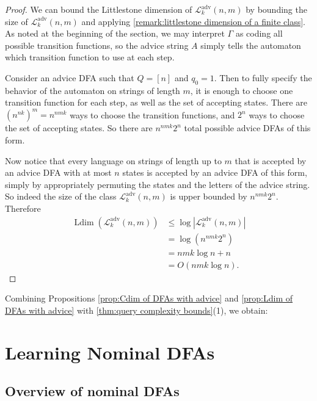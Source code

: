 \documentclass[runningheads]{llncs}
\newcommand{\mc}{\mathcal}
\DeclareMathOperator{\Ldim}{Ldim}
\begin{document}
\begin{proof}
    We can bound the Littlestone dimension of $\mc L^{\text{adv}}_k(n,m)$ by bounding the size of $\mc L^{\text{adv}}_k(n,m)$ and applying \autoref{remark:littlestone dimension of a finite class}.
    As noted at the beginning of the section, we may interpret $\Gamma$ as coding all possible transition functions, so the advice string $A$ simply tells the automaton which transition function to use at each step. 
    
    Consider an advice DFA such that $Q = [n]$ and $q_0 = 1$. 
    Then to fully specify the behavior of the automaton on strings of length $m$, it is enough to choose one transition function for each step, as well as the set of accepting states. 
    There are $(n^{nk})^m = n^{nmk}$ ways to choose the transition functions, and $2^n$ ways to choose the set of accepting states. 
    So there are $n^{nmk} 2^n$ total possible advice DFAs of this form. 
    
    Now notice that every language on strings of length up to $m$ that is accepted by an advice DFA with at most $n$ states is accepted by an advice DFA of this form, simply by appropriately permuting the states and the letters of the advice string. 
    So indeed the size of the class $\mc L^{\text{adv}}_k(n,m)$ is upper bounded by $n^{nmk} 2^n$.
    Therefore
    \begin{align*}
    \Ldim(\mc L^{\text{adv}}_k(n,m)) &\leq \log |\mc L^{\text{adv}}_k(n,m)| \\
    &= \log(n^{nmk} 2^n) \\
    &= nmk \log n + n \\
    &= O(nmk \log n).
    \end{align*}
\end{proof}

Combining Propositions \ref{prop:Cdim of DFAs with advice} and \ref{prop:Ldim of DFAs with advice} with \autoref{thm:query complexity bounds}(1), we obtain:

\adviceLC



\section{Learning Nominal DFAs} \label{section:complexity of nominal DFAs}

\subsection{Overview of nominal DFAs}
\end{document}
